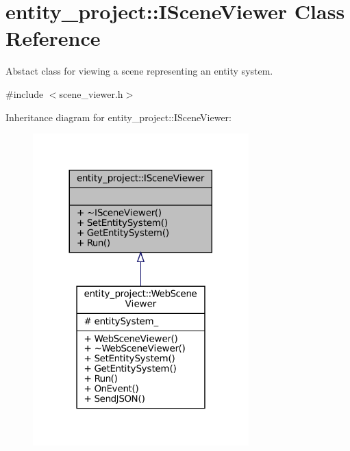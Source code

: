 \hypertarget{classentity__project_1_1ISceneViewer}{}\section{entity\+\_\+project\+:\+:I\+Scene\+Viewer Class Reference}
\label{classentity__project_1_1ISceneViewer}


Abstact class for viewing a scene representing an entity system.  




{\ttfamily \#include $<$scene\+\_\+viewer.\+h$>$}



Inheritance diagram for entity\+\_\+project\+:\+:I\+Scene\+Viewer\+:
\nopagebreak
\begin{figure}[H]
\begin{center}
\leavevmode
\includegraphics[width=236pt]{classentity__project_1_1ISceneViewer__inherit__graph}
\end{center}
\end{figure}
